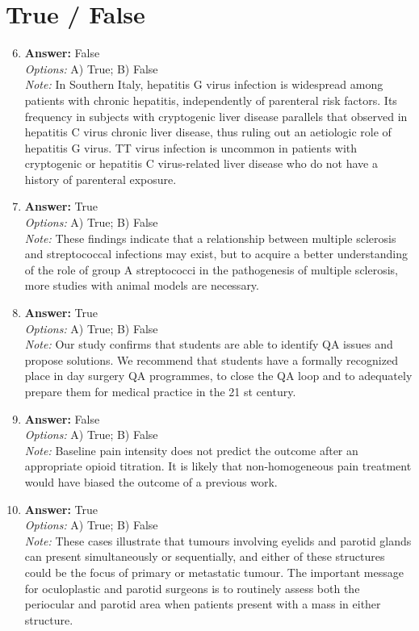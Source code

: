 \documentclass[12pt]{article}
\begin{document}
\section*{True / False}
\begin{enumerate}[label=\arabic*.]
\setcounter{enumi}{5}
\item \textbf{Answer:} False
\\ \textit{Options:} A) True; B) False
\\ \textit{Note:} In Southern Italy, hepatitis G virus infection is widespread among patients with chronic hepatitis, independently of parenteral risk factors. Its frequency in subjects with cryptogenic liver disease parallels that observed in hepatitis C virus chronic liver disease, thus ruling out an aetiologic role of hepatitis G virus. TT virus infection is uncommon in patients with cryptogenic or hepatitis C virus-related liver disease who do not have a history of parenteral exposure.
\item \textbf{Answer:} True
\\ \textit{Options:} A) True; B) False
\\ \textit{Note:} These findings indicate that a relationship between multiple sclerosis and streptococcal infections may exist, but to acquire a better understanding of the role of group A streptococci in the pathogenesis of multiple sclerosis, more studies with animal models are necessary.
\item \textbf{Answer:} True
\\ \textit{Options:} A) True; B) False
\\ \textit{Note:} Our study confirms that students are able to identify QA issues and propose solutions. We recommend that students have a formally recognized place in day surgery QA programmes, to close the QA loop and to adequately prepare them for medical practice in the 21 st century.
\item \textbf{Answer:} False
\\ \textit{Options:} A) True; B) False
\\ \textit{Note:} Baseline pain intensity does not predict the outcome after an appropriate opioid titration. It is likely that non-homogeneous pain treatment would have biased the outcome of a previous work.
\item \textbf{Answer:} True
\\ \textit{Options:} A) True; B) False
\\ \textit{Note:} These cases illustrate that tumours involving eyelids and parotid glands can present simultaneously or sequentially, and either of these structures could be the focus of primary or metastatic tumour. The important message for oculoplastic and parotid surgeons is to routinely assess both the periocular and parotid area when patients present with a mass in either structure.
\end{enumerate}
\end{document}
